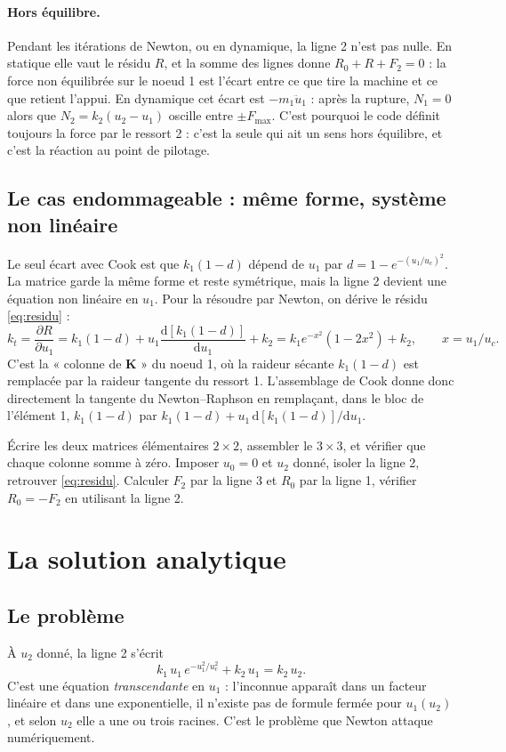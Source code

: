 \documentclass[11pt,a4paper]{article}
\newcommand{\dd}{\mathrm{d}}
\newcommand{\kun}{k_1(1-d)}
\begin{document}
\paragraph{Hors équilibre.} Pendant les itérations de Newton, ou en dynamique, la ligne 2
n'est pas nulle. En statique elle vaut le résidu $R$, et la somme des lignes donne
$R_0 + R + F_2 = 0$ : la force non équilibrée sur le noeud 1 est l'écart entre ce que tire la
machine et ce que retient l'appui. En dynamique cet écart est $-m_1\ddot u_1$ : après la
rupture, $N_1 = 0$ alors que $N_2 = k_2(u_2-u_1)$ oscille entre $\pm F_{\max}$. C'est pourquoi
le code définit toujours la force par le ressort 2 : c'est la seule qui ait un sens hors
équilibre, et c'est la réaction au point de pilotage.

\subsection{Le cas endommageable : même forme, système non linéaire}
Le seul écart avec Cook est que $\kun$ dépend de $u_1$ par $d = 1-e^{-(u_1/u_c)^2}$. La
matrice garde la même forme et reste symétrique, mais la ligne 2 devient une équation
non linéaire en $u_1$. Pour la résoudre par Newton, on dérive le résidu \eqref{eq:residu} :
\begin{equation}
  k_t = \frac{\partial R}{\partial u_1} = \kun + u_1\frac{\dd[\kun]}{\dd u_1} + k_2
  = k_1e^{-x^2}(1-2x^2) + k_2,\qquad x = u_1/u_c .
\end{equation}
C'est la « colonne de $\mathbf K$ » du noeud 1, où la raideur sécante $\kun$ est remplacée par
la raideur tangente du ressort 1. L'assemblage de Cook donne donc directement la tangente du
Newton--Raphson en remplaçant, dans le bloc de l'élément 1, $\kun$ par $\kun + u_1\,\dd[\kun]/\dd u_1$.

\begin{alamain}
Écrire les deux matrices élémentaires $2\times2$, assembler le $3\times3$, et vérifier que
chaque colonne somme à zéro. Imposer $u_0 = 0$ et $u_2$ donné, isoler la ligne 2, retrouver
\eqref{eq:residu}. Calculer $F_2$ par la ligne 3 et $R_0$ par la ligne 1, vérifier $R_0 = -F_2$ en
utilisant la ligne 2.
\end{alamain}

\section{La solution analytique}

\subsection{Le problème}
À $u_2$ donné, la ligne 2 s'écrit
\begin{equation}
  k_1\,u_1\,e^{-u_1^2/u_c^2} + k_2\,u_1 = k_2\,u_2 .
  \label{eq:transc}
\end{equation}
C'est une équation \emph{transcendante} en $u_1$ : l'inconnue apparaît dans un facteur
linéaire et dans une exponentielle, il n'existe pas de formule fermée pour $u_1(u_2)$, et
selon $u_2$ elle a une ou trois racines. C'est le problème que Newton attaque numériquement.
\end{document}
